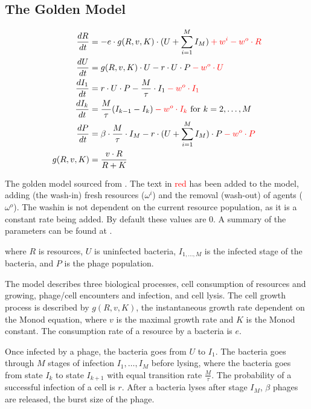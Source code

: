 \subsection{The Golden Model}
\begin{eqfloat}
    \begin{align}
        \frac{dR}{dt} &= -e \cdot g(R, v, K)\cdot (U + \sum_{i=1}^{M} I_M) \mathcolor{red}{+ w^i -w^o \cdot R}\\
        \frac{dU}{dt} &= g(R, v, K)\cdot U - r\cdot U \cdot P \mathcolor{red}{-w^o \cdot U}\\
        \frac{dI_1}{dt} &= r\cdot U \cdot P - \frac{M}{\tau}\cdot I_1 \mathcolor{red}{-w^o \cdot I_1}\\
        \frac{dI_k}{dt} &= \frac{M}{\tau}(I_{k-1}-I_k) \mathcolor{red}{-w^o \cdot I_k}\text{ for } k=2, \dots, M \\
        \frac{dP}{dt} &= \beta \cdot\frac{M}{\tau} \cdot I_M - r\cdot(U + \sum_{i=1}^{M} I_M)\cdot P \mathcolor{red}{-w^o \cdot P} \\
        g(R, v, K) &= \frac{v\cdot R}{R + K}
        \label{eq:golden_model}
    \end{align}
    \caption{
        The golden model sourced from \citet{gengUsingBacterialPopulation2024}. 
        The text in \textcolor{red}{red} has been added to the model, adding (the wash-in) fresh resources ($\omega^i$) and the removal (wash-out) of agents ($\omega^o$). 
        The washin is not dependent on the current resource population, as it is a constant rate being added. 
        By default these values are 0.
        A summary of the parameters can be found at . 
    }
\end{eqfloat}

where $R$ is resources, $U$ is uninfected bacteria, $I_{1, \dots, M}$ is the infected stage of the bacteria, and $P$ is the phage population. 

The model describes three biological processes, cell consumption of resources and growing, phage/cell encounters and infection, and cell lysis. 
The cell growth process is described by $g(R, v, K)$, the instantaneous growth rate dependent on the Monod equation, where $v$ is the maximal growth rate and $K$ is the Monod constant. 
The consumption rate of a resource by a bacteria is $e$. 

Once infected by a phage, the bacteria goes from $U$ to $I_1$. 
The bacteria goes through $M$ stages of infection $I_1, \dots, I_M$ before lysing, where the bacteria goes from state $I_k$ to state $I_{k+1}$ with equal transition rate $\frac{M}{\tau}$. The probability of a successful infection of a cell is $r$. 
After a bacteria lyses after stage $I_M$, $\beta$ phages are released, the burst size of the phage. 

